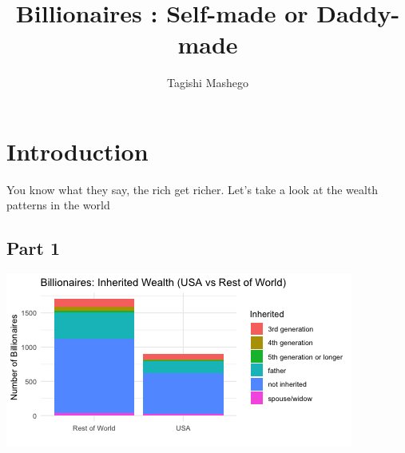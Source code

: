 \documentclass[11pt,preprint]{elsarticle}
\let\origfigure\figure
\let\endorigfigure\endfigure
\renewenvironment{figure}[1][2] {
    \expandafter\origfigure\expandafter[H]
} {
    \endorigfigure
}
\numberwithin{equation}{section}
\numberwithin{figure}{section}
\numberwithin{table}{section}
\begin{document}
\begin{frontmatter}  %

\title{Billionaires : Self-made or Daddy-made}





\author[Add1]{Tagishi Mashego}
\ead{}








\vspace{1cm}





\vspace{0.5cm}

\end{frontmatter}

\setcounter{footnote}{0}



\pagestyle{fancy}
\chead{}
\rhead{}
\lfoot{}
\lhead{}
\cfoot{}


\headsep 35pt %




\section{Introduction}\label{introduction}

You know what they say, the rich get richer. Let's take a look at the
wealth patterns in the world

\subsection{Part 1}\label{part-1}

\begin{figure}[H]

{\centering \includegraphics{Question4_files/figure-latex/Figure1-1} 

}

\caption{Billionaire Comparison \label{Figure1}}\label{fig:Figure1}
\end{figure}
\end{document}
